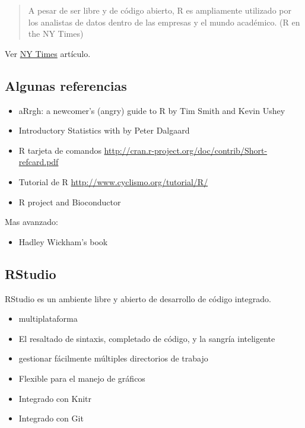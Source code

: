 \documentclass[
]{book}
\providecommand{\tightlist}{%
  \setlength{\itemsep}{0pt}\setlength{\parskip}{0pt}}
\begin{document}
\begin{quote}
A pesar de ser libre y de código abierto, R es ampliamente utilizado por los analistas de datos dentro de las empresas y el mundo académico. (R en the NY Times)
\end{quote}

Ver \href{https://www.nytimes.com/2009/01/07/technology/business-computing/07program.html?pagewanted=all\&_r=0}{NY Times} artículo.

\hypertarget{algunas-referencias}{%
\subsection{Algunas referencias}\label{algunas-referencias}}

\begin{itemize}
\tightlist
\item
  aRrgh: a newcomer's (angry) guide to R by Tim Smith and Kevin Ushey
\item
  Introductory Statistics with by Peter Dalgaard
\item
  R tarjeta de comandos \url{http://cran.r-project.org/doc/contrib/Short-refcard.pdf}
\item
  Tutorial de R \url{http://www.cyclismo.org/tutorial/R/}
\item
  R project and Bioconductor
\end{itemize}

Mas avanzado:

\begin{itemize}
\tightlist
\item
  Hadley Wickham's book
\end{itemize}

\hypertarget{rstudio}{%
\subsection{RStudio}\label{rstudio}}

RStudio es un ambiente libre y abierto de desarrollo de código integrado.

\begin{itemize}
\tightlist
\item
  multiplataforma
\item
  El resaltado de sintaxis, completado de código, y la sangría inteligente
\item
  gestionar fácilmente múltiples directorios de trabajo
\item
  Flexible para el manejo de gráficos
\item
  Integrado con Knitr
\item
  Integrado con Git
\end{itemize}
\end{document}
